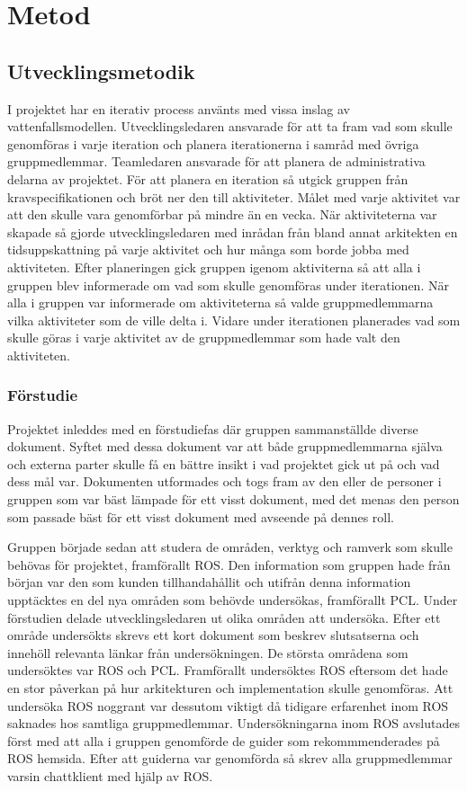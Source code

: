 \chapter{Metod}
\label{cha:method}

\section{Utvecklingsmetodik}

I projektet har en iterativ process använts med vissa inslag av vattenfallsmodellen. Utvecklingsledaren ansvarade för att ta fram vad som skulle genomföras i varje iteration och planera iterationerna i samråd med övriga gruppmedlemmar. Teamledaren ansvarade för att planera de administrativa delarna av projektet. För att planera en iteration så utgick gruppen från kravspecifikationen och bröt ner den till aktiviteter. Målet med varje aktivitet var att den skulle vara genomförbar på mindre än en vecka. När aktiviteterna var skapade så gjorde utvecklingsledaren med inrådan från bland annat arkitekten en tidsuppskattning på varje aktivitet och hur många som borde jobba med aktiviteten. Efter planeringen gick gruppen igenom aktiviterna så att alla i gruppen blev informerade om vad som skulle genomföras under iterationen. När alla i gruppen var informerade om aktiviteterna så valde gruppmedlemmarna vilka aktiviteter som de ville delta i. Vidare under iterationen planerades vad som skulle göras i varje aktivitet av de gruppmedlemmar som hade valt den aktiviteten.

\subsection{Förstudie}

Projektet inleddes med en förstudiefas där gruppen sammanställde diverse dokument. Syftet med dessa dokument var att både gruppmedlemmarna själva och externa parter skulle få en bättre insikt i vad projektet gick ut på och vad dess mål var. Dokumenten utformades och togs fram av den eller de personer i gruppen som var bäst lämpade för ett visst dokument, med det menas den person som passade bäst för ett visst dokument med avseende på dennes roll.

Gruppen började sedan att studera de områden, verktyg och ramverk som skulle behövas för projektet, framförallt ROS. Den information som gruppen hade från början var den som kunden tillhandahållit och utifrån denna information upptäcktes en del nya områden som behövde undersökas, framförallt PCL. Under förstudien delade utvecklingsledaren ut olika områden att undersöka. Efter ett område undersökts skrevs ett kort dokument som beskrev slutsatserna och innehöll relevanta länkar från undersökningen. De största områdena som undersöktes var ROS och PCL. Framförallt undersöktes ROS eftersom det hade en stor påverkan på hur arkitekturen och implementation skulle genomföras. Att undersöka ROS noggrant var dessutom viktigt då tidigare erfarenhet inom ROS saknades hos samtliga gruppmedlemmar. 
Undersökningarna inom ROS avslutades först med att alla i gruppen genomförde de guider som rekommmenderades på ROS hemsida. Efter att guiderna var genomförda så skrev alla gruppmedlemmar varsin chattklient med hjälp av ROS.

